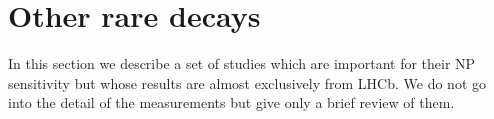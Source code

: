 \section{Other rare decays}


In this section we describe a set of studies which are important for their NP sensitivity 
but whose results are almost exclusively from LHCb. 
We do not go into the detail of the measurements but give only a brief review of them.




